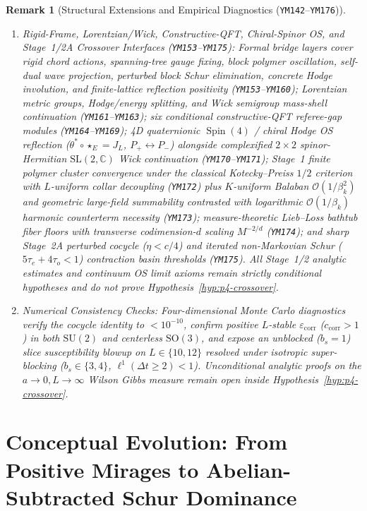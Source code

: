 \documentclass[11pt,a4paper]{article}
\newtheorem{remark}[theorem]{Remark}
\newcommand{\SU}{\mathrm{SU}}
\begin{document}
\begin{remark}[Structural Extensions and Empirical Diagnostics (\texttt{YM142}--\texttt{YM176})]
\begin{enumerate}
\item \emph{Rigid-Frame, Lorentzian/Wick, Constructive-QFT, Chiral-Spinor OS, and Stage~1/2A Crossover Interfaces (\texttt{YM153}--\texttt{YM175}):} Formal bridge layers cover rigid chord actions, spanning-tree gauge fixing, block polymer oscillation, self-dual wave projection, perturbed block Schur elimination, concrete Hodge involution, and finite-lattice reflection positivity (\texttt{YM153}--\texttt{YM160}); Lorentzian metric groups, Hodge/energy splitting, and Wick semigroup mass-shell continuation (\texttt{YM161}--\texttt{YM163}); six conditional constructive-QFT referee-gap modules (\texttt{YM164}--\texttt{YM169}); 4D quaternionic $\operatorname{Spin}(4)$ / chiral Hodge OS reflection ($\theta^* \circ \star_E = J_L$, $P_+ \leftrightarrow P_-$) alongside complexified $2\times 2$ spinor-Hermitian $\mathrm{SL}(2,\mathbb{C})$ Wick continuation (\texttt{YM170}--\texttt{YM171}); Stage~1 finite polymer cluster convergence under the classical Kotecky--Preiss $1/2$ criterion with $L$-uniform collar decoupling (\texttt{YM172}) plus $K$-uniform Balaban $\mathcal{O}(1/\beta_k^2)$ and geometric large-field summability contrasted with logarithmic $\mathcal{O}(1/\beta_k)$ harmonic counterterm necessity (\texttt{YM173}); measure-theoretic Lieb--Loss bathtub fiber floors with transverse codimension-$d$ scaling $M^{-2/d}$ (\texttt{YM174}); and sharp Stage~2A perturbed cocycle ($\eta < c/4$) and iterated non-Markovian Schur ($5\tau_e + 4\tau_o < 1$) contraction basin thresholds (\texttt{YM175}). All Stage~1/2 analytic estimates and continuum OS limit axioms remain strictly conditional hypotheses and do not prove Hypothesis~\ref{hyp:p4-crossover}.
\item \emph{Numerical Consistency Checks:} Four-dimensional Monte Carlo diagnostics verify the cocycle identity to $< 10^{-10}$, confirm positive $L$-stable $\varepsilon_{\mathrm{corr}}$ ($c_{\mathrm{corr}} > 1$) in both $\SU(2)$ and centerless $\mathrm{SO}(3)$, and expose an unblocked ($b_s = 1$) slice susceptibility blowup on $L \in \{10,12\}$ resolved under isotropic super-blocking ($b_s \in \{3,4\}$, $\ell^1(\Delta t \ge 2) < 1$). Unconditional analytic proofs on the $a \to 0, L \to \infty$ Wilson Gibbs measure remain open inside Hypothesis~\ref{hyp:p4-crossover}.
\end{enumerate}
\end{remark}

\section{Conceptual Evolution: From Positive Mirages to Abelian-Subtracted Schur Dominance}
\label{sec:conceptual-evolution}
\end{document}

